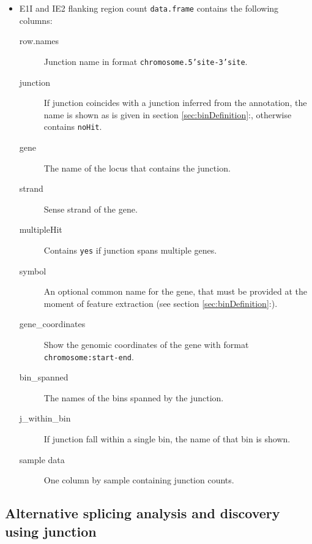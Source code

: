 \documentclass{article}
\begin{document}
\begin{itemize}
  \item E1I and IE2 flanking region count \texttt{data.frame} contains the
  following columns:
    \begin{description}
      \item[row.names] Junction name in format \texttt{chromosome.5'site-3'site}.
      \item[junction] If junction coincides with a junction inferred
      from the annotation, the name is shown as is given in section
      \ref{sec:binDefinition}:, otherwise
      contains \texttt{noHit}.
      \item[gene] The name of the locus that contains the junction.
      \item[strand] Sense strand of the gene.
      \item[multipleHit] Contains \texttt{yes} if junction spans multiple
      genes.
      \item[symbol] An optional common name for the gene, that must be provided at
      the moment of feature extraction (see section \ref{sec:binDefinition}:).
      \item[gene\_coordinates] Show the genomic coordinates of the gene with
      format \texttt{chromosome:start-end}.
      \item[bin\_spanned] The names of the bins spanned by the junction.
      \item[j\_within\_bin] If junction fall within a single bin, the name of
      that bin is shown.
      \item[sample data] One column by sample containing junction counts.
      \\
    \end{description}
    
\end{itemize}

\subsection{ Alternative splicing analysis and discovery using junction }
\end{document}
